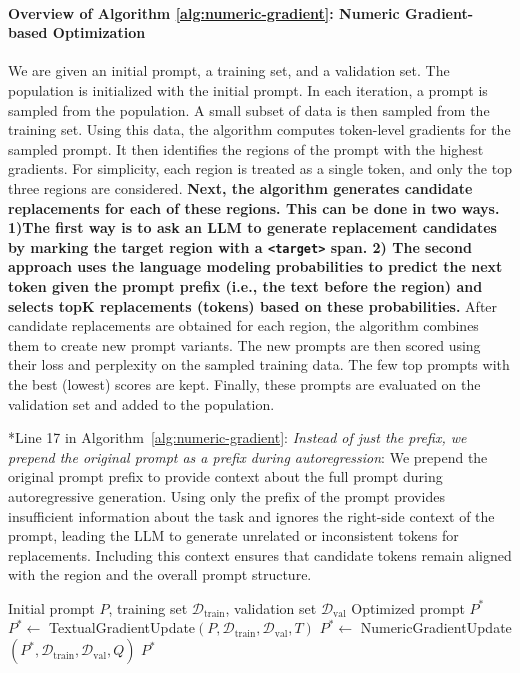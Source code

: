 \documentclass[12pt]{article}
\begin{document}
\paragraph{Overview of Algorithm \ref{alg:numeric-gradient}: Numeric Gradient-based Optimization}
We are given an initial prompt, a training set, and a validation set.
The population is initialized with the initial prompt.
In each iteration, a prompt is sampled from the population.
A small subset of data is then sampled from the training set.
Using this data, the algorithm computes token-level gradients for the sampled prompt.
It then identifies the regions of the prompt with the highest gradients.
For simplicity, each region is treated as a single token, and only the top three regions are considered.
\textbf{Next, the algorithm generates candidate replacements for each of these regions.
This can be done in two ways.
1)The first way is to ask an LLM to generate replacement candidates by marking the target region with a \texttt{<target>} span.
2) The second approach uses the language modeling probabilities to predict the next token given the prompt prefix (i.e., the text before the region)
 and selects topK replacements (tokens) based on these probabilities.}
After candidate replacements are obtained for each region, the algorithm combines them to create new prompt variants.
The new prompts are then scored using their loss and perplexity on the sampled training data.
The few top prompts with the best (lowest) scores are kept.
Finally, these prompts are evaluated on the validation set and added to the population.

*Line 17 in Algorithm~\ref{alg:numeric-gradient}: \textit{Instead of just the prefix, we prepend the original prompt as a prefix during autoregression}: 
We prepend the original prompt prefix to provide context about the full prompt during autoregressive generation. 
Using only the prefix of the prompt provides insufficient information about the task and 
ignores the right-side context of the prompt, leading the LLM to generate unrelated or inconsistent tokens for replacements. 
Including this context ensures that candidate tokens remain aligned with the region and the overall prompt structure.

\begin{algorithm}
\caption{Prompt Optimization}
\label{alg:prompt-optimization}
\begin{algorithmic}[1]
\Require Initial prompt $P$, training set $\mathcal{D}_{\text{train}}$, validation set $\mathcal{D}_{\text{val}}$
\Ensure Optimized prompt $P^{*}$
\State $P^{*} \gets$ TextualGradientUpdate$(P, \mathcal{D}_{\text{train}}, \mathcal{D}_{\text{val}}, T)$ 
\State $P^{*} \gets$ NumericGradientUpdate$(P^{*}, \mathcal{D}_{\text{train}}, \mathcal{D}_{\text{val}}, Q)$ 
\State \Return $P^{*}$
\end{algorithmic}
\end{algorithm}
\end{document}
